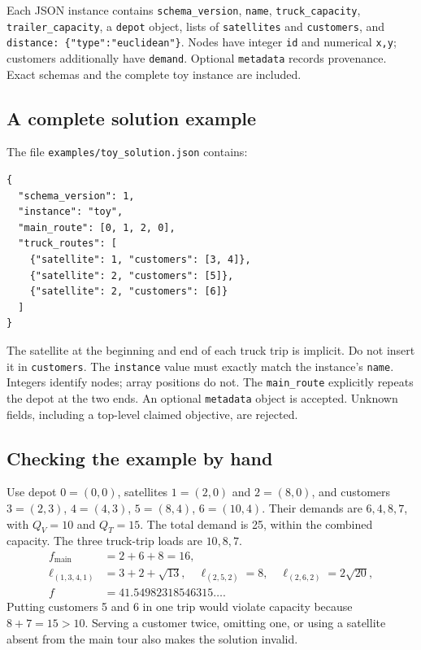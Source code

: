 \documentclass[11pt,a4paper]{article}
\newcommand{\code}[1]{{\small\texttt{#1}}}
\begin{document}
Each JSON instance contains \code{schema\_\allowbreak{}version}, \code{name}, \code{truck\_\allowbreak{}capacity}, \code{trailer\_\allowbreak{}capacity}, a \code{depot} object, lists of \code{satellites} and \code{customers}, and \code{distance: \{"type":"euclidean"\}}. Nodes have integer \code{id} and numerical \code{x,y}; customers additionally have \code{demand}. Optional \code{metadata} records provenance. Exact schemas and the complete toy instance are included.

\subsection{A complete solution example}
The file \code{examples/\allowbreak{}toy\_\allowbreak{}solution.json} contains:
\begin{lstlisting}
{
  "schema_version": 1,
  "instance": "toy",
  "main_route": [0, 1, 2, 0],
  "truck_routes": [
    {"satellite": 1, "customers": [3, 4]},
    {"satellite": 2, "customers": [5]},
    {"satellite": 2, "customers": [6]}
  ]
}
\end{lstlisting}
The satellite at the beginning and end of each truck trip is implicit. Do not insert it in \code{customers}. The \code{instance} value must exactly match the instance's \code{name}. Integers identify nodes; array positions do not. The \code{main\_\allowbreak{}route} explicitly repeats the depot at the two ends. An optional \code{metadata} object is accepted. Unknown fields, including a top-level claimed objective, are rejected.


\subsection{Checking the example by hand}
Use depot $0=(0,0)$, satellites $1=(2,0)$ and $2=(8,0)$, and customers $3=(2,3)$, $4=(4,3)$, $5=(8,4)$, $6=(10,4)$. Their demands are $6,4,8,7$, with $Q_V=10$ and $Q_T=15$. The total demand is 25, within the combined capacity. The three truck-trip loads are $10,8,7$.
\[
\begin{aligned}
f_{\mathrm{main}}&=2+6+8=16,\\
\ell_{(1,3,4,1)}&=3+2+\sqrt{13},\quad
\ell_{(2,5,2)}=8,\quad \ell_{(2,6,2)}=2\sqrt{20},\\
f&=\boxed{41.54982318546315\ldots}.
\end{aligned}
\]
Putting customers 5 and 6 in one trip would violate capacity because $8+7=15>10$. Serving a customer twice, omitting one, or using a satellite absent from the main tour also makes the solution invalid.
\end{document}
